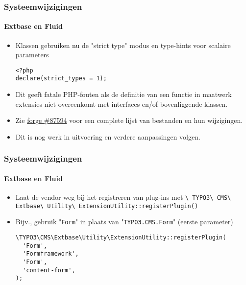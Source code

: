 \begin{frame}[fragile]
	\frametitle{Systeemwijzigingen}
	\framesubtitle{Extbase en Fluid}

	\lstset{basicstyle=\smaller\ttfamily}

	\begin{itemize}
		\item Klassen gebruiken nu de "strict type" modus en type-hints voor scalaire parameters
\begin{lstlisting}
<?php
declare(strict_types = 1);
\end{lstlisting}

		\item Dit geeft fatale PHP-fouten als de definitie van een functie in maatwerk
			extensies niet overeenkomt met interfaces en/of bovenliggende klassen.

		\item Zie \href{https://forge.typo3.org/issues/87594}{forge \#87594}
			voor een complete lijst van bestanden en hun wijzigingen.

		\item Dit is nog werk in uitvoering en verdere aanpassingen volgen.

	\end{itemize}

\end{frame}


\begin{frame}[fragile]
	\frametitle{Systeemwijzigingen}
	\framesubtitle{Extbase en Fluid}

	\lstset{basicstyle=\smaller\ttfamily}

	\begin{itemize}
		\item Laat de vendor weg bij het registreren van plug-ins met\newline
			\smaller
				\texttt{\textbackslash
					TYPO3\textbackslash
					CMS\textbackslash
					Extbase\textbackslash
					Utility\textbackslash
					ExtensionUtility::registerPlugin()}
			\normalsize

		\item Bijv., gebruik "\texttt{Form}" in plaats van "\texttt{TYPO3.CMS.Form}"\newline
			\small(eerste parameter)\normalsize
\begin{lstlisting}
\TYPO3\CMS\Extbase\Utility\ExtensionUtility::registerPlugin(
  'Form',
  'Formframework',
  'Form',
  'content-form',
);
\end{lstlisting}

	\end{itemize}

\end{frame}

